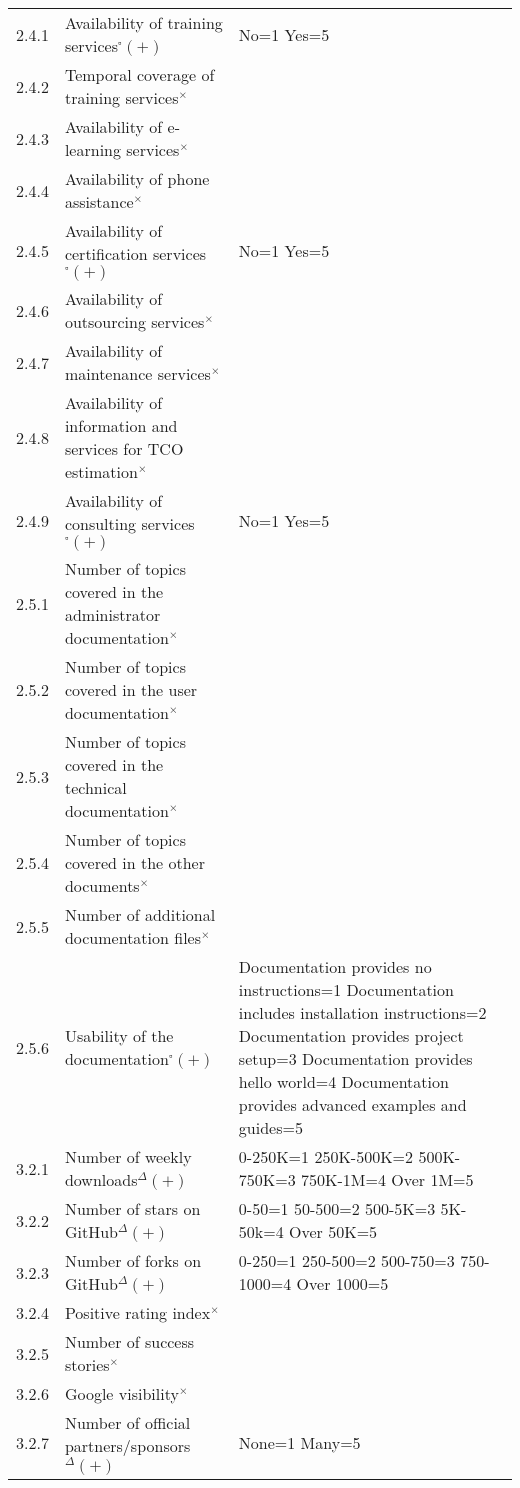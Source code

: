 \begin{longtable}[]{|p{1cm}p{6cm}p{6cm}|}
2.4.1 & Availability of training services$^{\square}(+)$ & No=1 Yes=5 \\
2.4.2 & Temporal coverage of training services$^{\times}$ & \\
2.4.3 & Availability of e-learning services$^{\times}$ & \\
2.4.4 & Availability of phone assistance$^{\times}$ & \\
2.4.5 & Availability of certification services$^{\square}(+)$ & No=1 Yes=5 \\
2.4.6 & Availability of outsourcing services$^{\times}$ & \\
2.4.7 & Availability of maintenance services$^{\times}$ & \\
2.4.8 & Availability of information and services for TCO estimation$^{\times}$ & \\
2.4.9 & Availability of consulting services$^{\square}(+)$ & No=1 Yes=5 \\
2.5.1 & Number of topics covered in the administrator documentation$^{\times}$ & \\
2.5.2 & Number of topics covered in the user documentation$^{\times}$ & \\
2.5.3 & Number of topics covered in the technical documentation$^{\times}$ & \\
2.5.4 & Number of topics covered in the other documents$^{\times}$ & \\
2.5.5 & Number of additional documentation files$^{\times}$ & \\
2.5.6 & Usability of the documentation$^{\square}(+)$ & Documentation provides no
instructions=1 Documentation includes installation instructions=2
Documentation provides project setup=3 Documentation provides hello
world=4 Documentation provides advanced examples and guides=5 \\
3.2.1 & Number of weekly downloads$^{\Delta}(+)$ & 0-250K=1 250K-500K=2 500K-750K=3
750K-1M=4 Over 1M=5 \\
3.2.2 & Number of stars on GitHub$^{\Delta}(+)$ & 0-50=1
50-500=2 500-5K=3 5K-50k=4 Over 50K=5 \\
3.2.3 & Number of forks on GitHub$^{\Delta}(+)$ &
0-250=1 250-500=2 500-750=3 750-1000=4 Over 1000=5 \\
3.2.4 & Positive rating index$^{\times}$ & \\
3.2.5 & Number of success stories$^{\times}$ & \\
3.2.6 & Google visibility$^{\times}$ & \\
3.2.7 & Number of official partners/sponsors$^{\Delta}(+)$ & None=1 Many=5 \\

\end{longtable}
